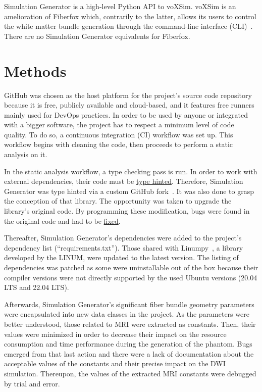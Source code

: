 \documentclass{article}
\begin{document}
  Simulation Generator is a high-level Python API to voXSim.
  voXSim is an amelioration of Fiberfox which, contrarily to the latter, allows its users to control the white matter
  bundle generation through the command-line interface (CLI)~\cite{valcourtcaron2022simulationgenerator, neher2014fiberfox}.
  There are no Simulation Generator equivalents for Fiberfox.


  \section{Methods}\label{sec:methodology}

  GitHub was chosen as the host platform for the project's source code repository because it is free, publicly available and cloud-based, and it features free runners mainly used for DevOps practices.
  In order to be used by anyone or integrated with a bigger software, the project has to respect a minimum level of code quality.
  To do so, a continuous integration (CI) workflow was set up.
  This workflow begins with cleaning the code, then proceeds to perform a static analysis on it.

  In the static analysis workflow, a type checking pass is run.
  In order to work with external dependencies, their code must be \href{https://docs.python.org/3/library/typing.html}{type hinted}.
  Therefore, Simulation Generator was type hinted via a custom GitHub fork~\cite{dubreuil2022inm5803simgenfork, valcourtcaron2022simulationgenerator}.
  It was also done to grasp the conception of that library.
  The opportunity was taken to upgrade the library's original code.
  By programming these modification, bugs were found in the original code and had to be \href{https://github.com/benoit-dubreuil/voxsim/pulls?q=is\%3Apr+is\%3Aclosed}{fixed}.

  Thereafter, Simulation Generator's dependencies were added to the project's dependency list (``requirements.txt'').
  Those shared with Linumpy~\cite{linum2022linumpy}, a library developed by the LINUM, were updated to the latest version.
  The listing of dependencies was patched as some were uninstallable out of the box because their compiler versions were not directly supported by the used Ubuntu versions (20.04 LTS and 22.04 LTS).

  Afterwards, Simulation Generator's significant fiber bundle geometry parameters were encapsulated into new data classes in the project.
  As the parameters were better understood, those related to MRI were extracted as constants.
  Then, their values were minimized in order to decrease their impact on the resource consumption and time performance during the generation of the phantom.
  Bugs emerged from that last action and there were a lack of documentation about the acceptable values of the constants and their precise impact on the DWI simulation.
  Thereupon, the values of the extracted MRI constants were debugged by trial and error.
\end{document}
